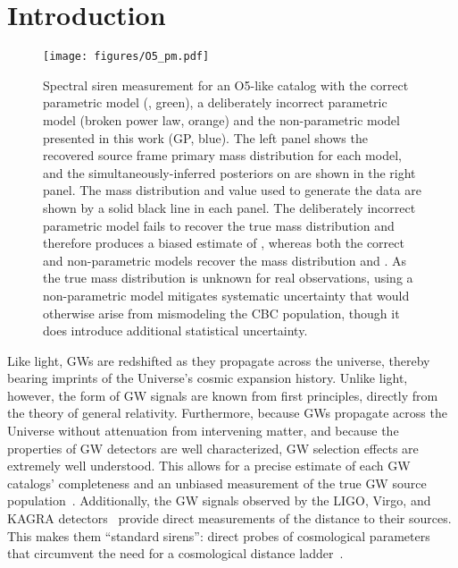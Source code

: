 \documentclass[preprint2,linenumbers]{aastex631}
\begin{document}
\section{Introduction}
\label{sec:intro}
\begin{figure*}
    \centering
    \texttt{[image: figures/O5\_pm.pdf]}
    \caption{Spectral siren measurement for an \ac{O5}-like catalog with the correct parametric model (\plp, green), a deliberately incorrect parametric model (broken power law, orange) and the non-parametric model presented in this work (\acl{GP}, blue).
    The left panel shows the recovered source frame primary mass distribution for each model, and the simultaneously-inferred posteriors on \Ho{} are shown in the right panel.
    The mass distribution and \Ho{} value used to generate the data are shown by a solid black line in each panel. 
    The deliberately incorrect parametric model fails to recover the true mass distribution and therefore produces a biased estimate of \Ho{}, whereas both the correct and non-parametric models recover  the mass distribution and \Ho{}.
    As the true mass distribution is unknown for real observations, using a non-parametric model mitigates systematic uncertainty that would otherwise arise from mismodeling the \ac{CBC} population, though it does introduce additional statistical uncertainty.
    }
    \label{fig:O5_GP}
\end{figure*}

Like light, \acp{GW} are redshifted as they propagate across the universe, thereby bearing imprints of the Universe's cosmic expansion history.
Unlike light, however, the form of \ac{GW} signals are known from first principles, directly from the theory of general relativity. Furthermore, because \acp{GW} propagate across the Universe without attenuation from intervening matter, and because the properties of \ac{GW} detectors are well characterized, \ac{GW} selection effects are extremely well understood.%
This allows for a precise estimate of each \ac{GW} catalogs' completeness and an unbiased measurement of the true \ac{GW} source population~\citep{2023PhRvX..13d1039A,abbott_population_2023,2023PhRvD.108d3011E}. 
Additionally, the \ac{GW} signals observed by the LIGO, Virgo, and KAGRA detectors~\citep{aasi_advanced_2015,acernese_advanced_2014,akutsu_overview_2021}  provide direct measurements of the distance to their sources.
This makes them ``standard sirens'': direct probes of cosmological parameters that circumvent the need for a cosmological distance ladder~\citep{schutz_determining_1986,holz_using_2005}. 
\end{document}
